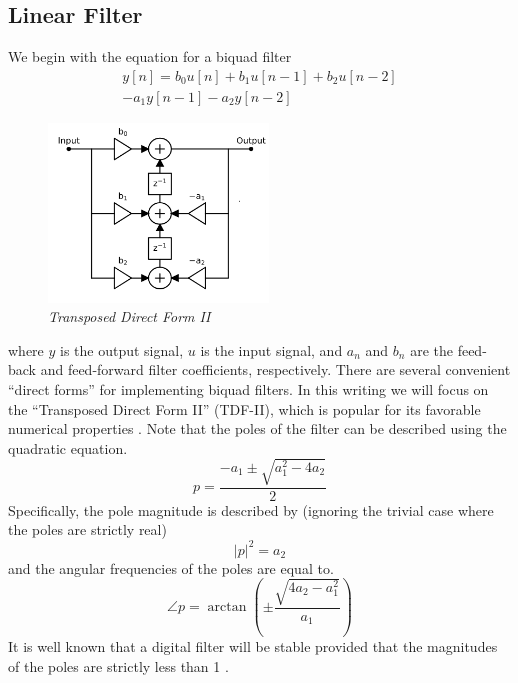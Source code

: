 \documentclass[twoside,a4paper]{article}
\begin{document}
\subsection{Linear Filter}
%
We begin with the equation for a biquad filter
%
\begin{equation}
\begin{split}
    y[n] = b_0 u[n] + b_1 u[n-1] + b_2 u[n-2] \\ - a_1 y[n-1] - a_2 y[n-2]
\end{split}
    \label{eq:bq}
\end{equation}
%
\begin{figure}[ht]
    \center
    \includegraphics[width=2.3in]{../Pics/TDF-II-White.png}
    \caption{\label{TDF-II}{\it Transposed Direct Form II}}
\end{figure}
%
where $y$ is the output signal, $u$ is the input signal, and $a_n$ and $b_n$
are the feed-back and feed-forward filter coefficients, respectively.
There are several convenient ``direct forms'' for implementing biquad filters.
In this writing we will focus on the ``Transposed Direct Form II'' (TDF-II),
which is popular for its favorable numerical properties \cite{JOSFilters}.
Note that the poles of the filter can be described using the quadratic
equation.
\begin{equation}
    p = \frac{-a_1 \pm \sqrt{a_1^2- 4a_2}}{2}
    \label{eq:poles_lin}
\end{equation}
%
Specifically, the pole magnitude is described by (ignoring the
trivial case where the poles are strictly real)
\begin{equation}
    |p|^2 = a_2
    \label{eq:poles_lin_mag}
\end{equation}
%
and the angular frequencies of the poles are equal to.
\begin{equation}
    \angle p = \arctan \left( \pm \frac{\sqrt{4a_2 - a_1^2}}{a_1} \right)
    \label{eq:poles_lin_angle}
\end{equation}
%
It is well known that a digital filter will be stable provided that
the magnitudes of the poles are strictly less than 1 \cite{JOSFilters}.
\newline
%
\end{document}
